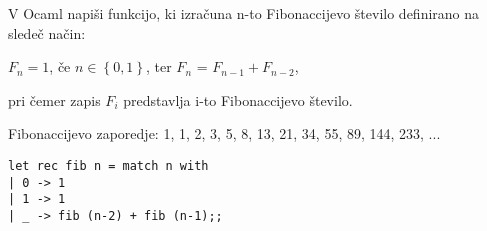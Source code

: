 \begin{ex}
V Ocaml napi\v si funkcijo, ki izra\v cuna n-to Fibonaccijevo \v stevilo definirano na slede\v c na\v cin:
\begin{center}
$F_n = 1$, \v ce $n\in \left\{ 0,1\right\}$, ter 
$F_n$ = $F_{n-1} + F_{n-2}$, 
\end{center}
pri \v cemer zapis $F_i$ predstavlja i-to Fibonaccijevo \v stevilo. 

Fibonaccijevo zaporedje: 1, 1, 2, 3, 5, 8, 13, 21, 34, 55, 89, 144, 233, ...

\begin{sol}
\begin{lstlisting}
let rec fib n = match n with
| 0 -> 1
| 1 -> 1
| _ -> fib (n-2) + fib (n-1);;
\end{lstlisting}
\end{sol}
\end{ex}




